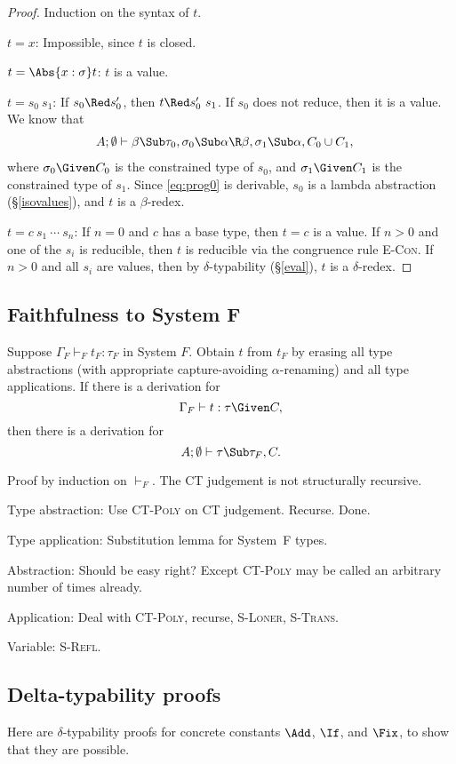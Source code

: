 \begin{proof}
Induction on the syntax of $t$.

\Case$t=x$: Impossible, since $t$ is closed.

\Case$t=\Abs{x:\sigma}t$: $t$ is a value.

\Case$t=s_0~s_1$: If $s_0\Red s_0'$, then $t\Red s_0'~s_1$. If
$s_0$ does not reduce, then it is a value. We know that
\begin{align}
A;\emptyset&\vdash \beta\Sub\tau_0,
\sigma_0\Sub\alpha\R\beta,\sigma_1\Sub\alpha,C_0\cup C_1,
\label{eq:prog0}
\end{align}
where $\sigma_0\Given C_0$ is the constrained type of $s_0$, and
$\sigma_1\Given C_1$ is the constrained type of $s_1$. Since
\eqref{eq:prog0} is derivable, $s_0$ is a lambda abstraction
(\S\ref{isovalues}), and $t$ is a $\beta$-redex.

\Case$t=c~s_1~\cdots~s_n$: If $n=0$ and $c$ has a base type, then
$t=c$ is a value. If $n>0$ and one of the $s_i$ is reducible,
then $t$ is reducible via the congruence rule \textsc{E-Con}. If
$n>0$ and all $s_i$ are values, then by $\delta$-typability
(\S\ref{eval}), $t$ is a $\delta$-redex.
\end{proof}

\subsection{Faithfulness to System F}

Suppose $\Gamma_F\vdash_F t_F:\tau_F$ in System $F$. Obtain $t$
from $t_F$ by erasing all type abstractions (with appropriate
capture-avoiding $\alpha$-renaming) and all type applications.
If there is a derivation for
\[
\Gamma_F\vdash t : \tau\Given C,
\]
then there is a derivation for
\[
A;\emptyset\vdash \tau\Sub\tau_F, C.
\]

Proof by induction on $\vdash_F$. The CT judgement is not
structurally recursive.

Type abstraction: Use \textsc{CT-Poly} on CT judgement. Recurse.
Done.

Type application: Substitution lemma for System~F types.

Abstraction: Should be easy right? Except \textsc{CT-Poly} may be
called an arbitrary number of times already.

Application: Deal with \textsc{CT-Poly}, recurse,
\textsc{S-Loner}, \textsc{S-Trans}.

Variable: \textsc{S-Refl}.

\subsection{Delta-typability proofs}
Here are $\delta$-typability proofs for concrete constants
$\Add$, $\If$, and $\Fix$, to show that they are possible.
